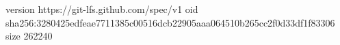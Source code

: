 version https://git-lfs.github.com/spec/v1
oid sha256:3280425edfeae7711385c00516dcb22905aaa064510b265cc2f0d33df1f83306
size 262240
